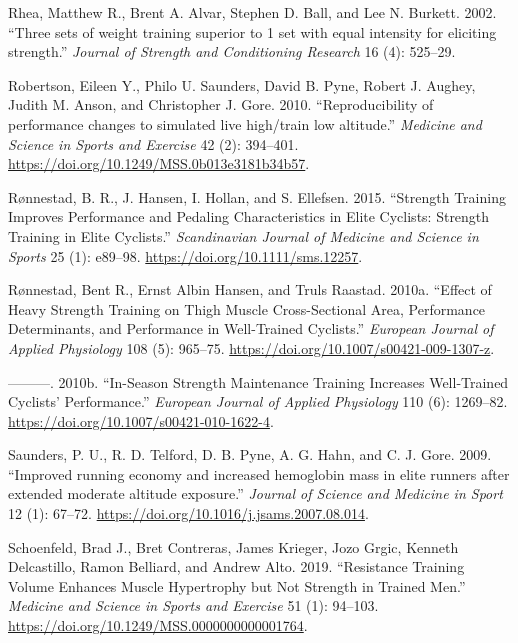 \documentclass[
]{book}
\newlength{\cslhangindent}
\newlength{\cslentryspacingunit} %
\newenvironment{CSLReferences}[2] %
 {%
  \setlength{\parindent}{0pt}
  \ifodd #1
  \let\oldpar\par
  \def\par{\hangindent=\cslhangindent\oldpar}
  \fi
  \setlength{\parskip}{#2\cslentryspacingunit}
 }%
 {}
\begin{document}
\begin{CSLReferences}{1}{0}
\leavevmode{}%
Rhea, Matthew R., Brent A. Alvar, Stephen D. Ball, and Lee N. Burkett.
2002. {``Three sets of weight training superior to 1 set with equal
intensity for eliciting strength.''} \emph{Journal of Strength and
Conditioning Research} 16 (4): 525--29.

\leavevmode{}%
Robertson, Eileen Y., Philo U. Saunders, David B. Pyne, Robert J.
Aughey, Judith M. Anson, and Christopher J. Gore. 2010.
{``Reproducibility of performance changes to simulated live high/train
low altitude.''} \emph{Medicine and Science in Sports and Exercise} 42
(2): 394--401. \url{https://doi.org/10.1249/MSS.0b013e3181b34b57}.

\leavevmode{}%
Rønnestad, B. R., J. Hansen, I. Hollan, and S. Ellefsen. 2015.
{``Strength Training Improves Performance and Pedaling Characteristics
in Elite Cyclists: Strength Training in Elite Cyclists.''}
\emph{Scandinavian Journal of Medicine and Science in Sports} 25 (1):
e89--98. \url{https://doi.org/10.1111/sms.12257}.

\leavevmode{}%
Rønnestad, Bent R., Ernst Albin Hansen, and Truls Raastad. 2010a.
{``Effect of Heavy Strength Training on Thigh Muscle Cross-Sectional
Area, Performance Determinants, and Performance in Well-Trained
Cyclists.''} \emph{European Journal of Applied Physiology} 108 (5):
965--75. \url{https://doi.org/10.1007/s00421-009-1307-z}.

\leavevmode{}%
---------. 2010b. {``In-Season Strength Maintenance Training Increases
Well-Trained Cyclists{'} Performance.''} \emph{European Journal of
Applied Physiology} 110 (6): 1269--82.
\url{https://doi.org/10.1007/s00421-010-1622-4}.

\leavevmode{}%
Saunders, P. U., R. D. Telford, D. B. Pyne, A. G. Hahn, and C. J. Gore.
2009. {``Improved running economy and increased hemoglobin mass in elite
runners after extended moderate altitude exposure.''} \emph{Journal of
Science and Medicine in Sport} 12 (1): 67--72.
\url{https://doi.org/10.1016/j.jsams.2007.08.014}.

\leavevmode{}%
Schoenfeld, Brad J., Bret Contreras, James Krieger, Jozo Grgic, Kenneth
Delcastillo, Ramon Belliard, and Andrew Alto. 2019. {``Resistance
Training Volume Enhances Muscle Hypertrophy but Not Strength in Trained
Men.''} \emph{Medicine and Science in Sports and Exercise} 51 (1):
94--103. \url{https://doi.org/10.1249/MSS.0000000000001764}.


\end{CSLReferences}
\end{document}
